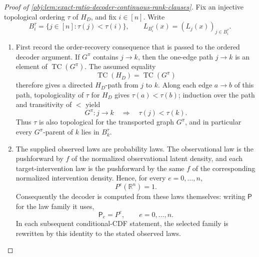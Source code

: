 \documentclass[11pt]{article}
\begin{document}
\begin{proof}[Proof of \cref{obj:lem:exact-ratio-decoder-continuous-rank-clauses}]
Fix an injective topological ordering \(\tau\) of \(H_D\), and fix \(i\in[n]\).  Write
\[
B_i^\tau=\{j\in[n]:\tau(j)<\tau(i)\},
\qquad
L_{B_i^\tau}(x)=(L_j(x))_{j\in B_i^\tau}.
\]

\begin{enumerate}
\item First record the order-recovery consequence that is passed to the ordered decoder argument.  If \(G^\pi\) contains \(j\to k\), then the one-edge path \(j\to k\) is an element of \(\operatorname{TC}(G^\pi)\).  The assumed equality
\[
\operatorname{TC}(H_D)=\operatorname{TC}(G^\pi)
\]
therefore gives a directed \(H_D\)-path from \(j\) to \(k\).  Along each edge \(a\to b\) of this path, topologicality of \(\tau\) for \(H_D\) gives \(\tau(a)<\tau(b)\); induction over the path and transitivity of \(<\) yield
\[
G^\pi:j\to k
\quad\Longrightarrow\quad
\tau(j)<\tau(k).
\]
Thus \(\tau\) is also topological for the transported graph \(G^\pi\), and in particular every \(G^\pi\)-parent of \(k\) lies in \(B_k^\tau\). %

\item The supplied observed laws are probability laws.  The observational law is the pushforward by \(f\) of the normalized observational latent density, and each target-intervention law is the pushforward by the same \(f\) of the corresponding normalized intervention density.  Hence, for every \(e=0,\ldots,n\),
\[
P^e(\mathbb R^n)=1.
\]
Consequently the decoder is computed from these laws themselves: writing \(\mathsf P\) for the law family it uses,
\[
\mathsf P_e=P^e,\qquad e=0,\ldots,n.
\]
In each subsequent conditional-CDF statement, the selected family is rewritten by this identity to the stated observed laws. %


\end{enumerate}
\end{proof}
\end{document}
